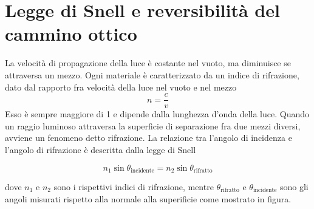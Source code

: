 \section{Legge di Snell e reversibilità del cammino ottico}
La velocità di propagazione della luce è costante nel vuoto, ma diminuisce se attraversa un mezzo. Ogni materiale è caratterizzato da un indice di rifrazione, dato dal rapporto fra velocità della luce nel vuoto e nel mezzo \[n=\frac{c}{v}\] Esso è sempre maggiore di 1 e dipende dalla lunghezza d'onda della luce. Quando un raggio luminoso attraversa la superficie di separazione fra due mezzi diversi, avviene un fenomeno detto rifrazione. La relazione tra l'angolo di incidenza e l'angolo di rifrazione è descritta dalla legge di Snell 

\begin{equation}
    n_1 \sin{\theta_{\text{incidente}}} = n_2 \sin{\theta_{\text{rifratto}}}
    \label{Legge di Snell}
\end{equation}

dove $n_1$ e $n_2$ sono i rispettivi indici di rifrazione, mentre $\theta_{\text{rifratto}}$ e $\theta_{\text{incidente}}$ sono gli angoli misurati rispetto alla normale alla superificie come mostrato in figura.


